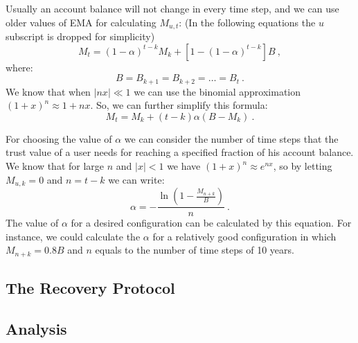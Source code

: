 Usually an account balance will not change in every time step, and we can use older values of EMA for calculating
\(M_{u,t}\): (In the following equations the \(u\) subscript is dropped for simplicity)
\[
    M_{t} = (1 - \alpha)^{t-k}M_{k} + [1 - (1 - \alpha)^{t - k}]B\ ,
\]
where:
\[
    B = B_{k+1} = B_{k+2} = \dots = B_{t}\ .
\]
We know that when \(|nx| \ll 1\) we can use the binomial approximation \({(1 + x)^n \approx 1 + nx}\). So, we can
further simplify this formula:
\[
    M_{t} = M_{k} + (t - k) \alpha (B - M_{k})\ .
\]

For choosing the value of \(\alpha\) we can consider the number of time steps that the trust value of a user needs
for reaching a specified fraction of his account balance. We know that for large \(n\) and \(|x| < 1\) we have
\((1 + x)^n \approx e^{nx}\), so by letting \(M_{u,k} = 0\) and \(n = t - k\) we can write:
\begin{equation}
    \alpha =- \frac{\ln\left(1 - \frac{M_{n+k}}{B}\right)}{n}\ .\label{eq:alpha}
\end{equation}
The value of \(\alpha\) for a desired configuration can be calculated by this equation. For instance, we could
calculate the \(\alpha\) for a relatively good configuration in which \(M_{n+k} = 0.8B\) and \(n\) equals to the
number of time steps of 10 years.


\subsection{The Recovery Protocol}\label{subsec:recovery}
%
\subsection{Analysis}\label{subsec:consensus-math}
